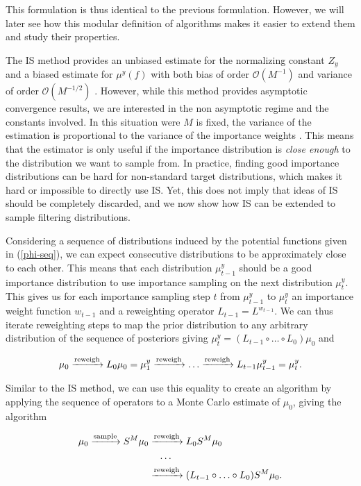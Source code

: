 This formulation is thus identical to the previous formulation. However, we will later see how this modular definition of algorithms makes it easier to extend them and study their properties.

The IS method provides an unbiased estimate for the normalizing constant $Z_y$ and a biased estimate for $\mu^y(f)$ with both bias of order $\mathcal{O}(M^{-1})$ and variance of order $\mathcal{O}(M^{-1/2})$ \cite{agapiou2017importance}. However, while this method provides asymptotic convergence results, we are interested in the non asymptotic regime and the constants involved. In this situation were $M$ is fixed, the variance of the estimation is proportional to the variance of the importance weights \cite{agapiou2017importance}. This means that the estimator is only useful if the importance distribution is \textit{close enough} to the distribution we want to sample from. In practice, finding good importance distributions can be hard for non-standard target distributions, which makes it hard or impossible to directly use IS. Yet, this does not imply that ideas of IS should be completely discarded, and we now show how IS can be extended to sample filtering distributions.

Considering a sequence of distributions induced by the potential functions given in (\ref{phi-seq}), we can expect consecutive distributions to be approximately close to each other. This means that each distribution $\mu^y_{t-1}$ should be a good importance distribution to use importance sampling on the next distribution $\mu^y_t$. This gives us for each importance sampling step $t$ from $\mu^y_{t-1}$ to $\mu^y_t$ an importance weight function $w_{t-1}$ and a reweighting operator $L_{t-1} = L^{w_{t-1}}$. We can thus iterate reweighting steps to map the prior distribution to any arbitrary distribution of the sequence of posteriors giving $\mu^y_t = (L_{t-1} \circ \ldots \circ L_0) \mu_0$ and

\begin{equation*}
  \mu_0 \xrightarrow{\text{reweigh}} L_0\mu_0 = \mu^y_1 \xrightarrow{\text{reweigh}} \ldots\xrightarrow{\text{reweigh}} L_{t-1}\mu^y_{t-1} = \mu^y_t.
\end{equation*}

Similar to the IS method, we can use this equality to create an algorithm by applying the sequence of operators to a Monte Carlo estimate of $\mu_0$, giving the algorithm

\begin{align*}
  \mu_0 \xrightarrow{\text{sample}} S^M\mu_0
  &\xrightarrow{\text{reweigh}} L_0S^M\mu_0\\
  &\ \ \ \ldots\\
  &\xrightarrow{\text{reweigh}} (L_{t-1} \circ \ldots \circ L_0)S^M\mu_0.
\end{align*}

